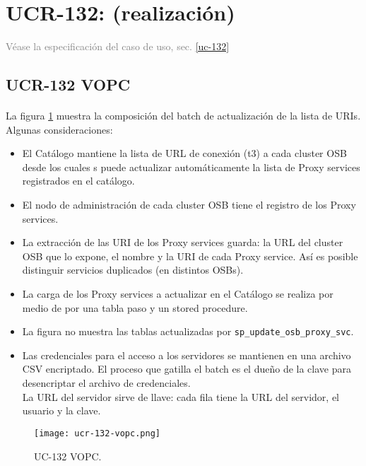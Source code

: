 \section{UCR-132: \ucCXxxiiTitle{}(realizaci\'on)}\label{sec:ucr-132}
\textcolor{gray}{V\'ease la especificaci\'on del caso de uso, sec. \ref{uc-132}}


\subsection{UCR-132 VOPC}
\paragraph{}
La figura \ref{fig:ucr-132-vopc} muestra la composici\'on del batch de actualizaci\'on
de la lista de URIs. Algunas consideraciones:

\begin{itemize}
    \item
        El Cat\'alogo mantiene la lista de URL de conexi\'on (t3) a cada cluster OSB
        desde los cuales s puede actualizar autom\'aticamente la lista de Proxy services
        registrados en el cat\'alogo.
    \item
        El nodo de administraci\'on de cada cluster OSB tiene el registro
        de los Proxy services.
    \item
        La extracci\'on de las URI de los Proxy services guarda:
        la URL del cluster OSB que lo expone, el nombre y la URI de cada Proxy service.
        As\'i es posible distinguir servicios duplicados (en distintos OSBs).
    \item
        La carga de los Proxy services a actualizar en el Cat\'alogo se realiza por medio de
        por una tabla paso y un stored procedure.
    \item
        La figura no muestra las tablas actualizadas por \verb|sp_update_osb_proxy_svc|.
    \item
        Las credenciales para el acceso a los servidores se mantienen en una archivo
        CSV encriptado.
        El proceso que gatilla el batch es el due\~no de la clave para desencriptar
        el archivo de credenciales.
        \\
        La URL del servidor sirve de llave:
        cada fila tiene la URL del servidor, el usuario y la clave.
\end{itemize}

\begin{figure}[hbtp]
    \centering
    \texttt{[image: ucr-132-vopc.png]}
    \caption{UC-132 VOPC.}\label{fig:ucr-132-vopc}
\end{figure}

